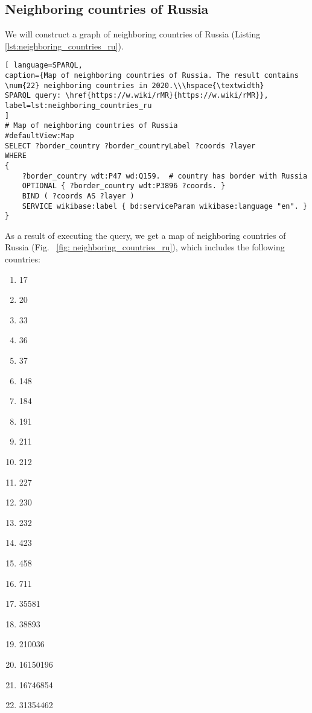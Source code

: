 \subsection{Neighboring countries of Russia}

We will construct a graph of neighboring countries of Russia (Listing \ref{lst:neighboring_countries_ru}).

\begin{lstlisting}[ language=SPARQL, 
caption={Map of neighboring countries of Russia. The result contains \num{22} neighboring countries in 2020.\\\hspace{\textwidth}
SPARQL query: \href{https://w.wiki/rMR}{https://w.wiki/rMR}},
label=lst:neighboring_countries_ru
]
# Map of neighboring countries of Russia
#defaultView:Map
SELECT ?border_country ?border_countryLabel ?coords ?layer
WHERE 
{
	?border_country wdt:P47 wd:Q159.  # country has border with Russia
	OPTIONAL { ?border_country wdt:P3896 ?coords. }
	BIND ( ?coords AS ?layer )
	SERVICE wikibase:label { bd:serviceParam wikibase:language "en". }
}
\end{lstlisting}

As a result of executing the query, we get a map of neighboring countries of Russia (Fig. ~\ref {fig: neighboring_countries_ru}), which includes the following countries:
\begin{enumerate}
	\item {} {17}
	\item {} {20}
	\item {} {33}
	\item {} {36}
	\item {} {37}
	\item {} {148}
	\item {} {184}
	\item {} {191}
	\item {} {211}
	\item {} {212}
	\item {} {227}
	\item {} {230}
	\item {} {232}
	\item {} {423}
	\item {} {458}
	\item {} {711}
	\item {} {35581}
	\item {} {38893}
	\item {} {210036}
	\item {} {16150196}
	\item {} {16746854}
	\item {} {31354462}
\end{enumerate}



